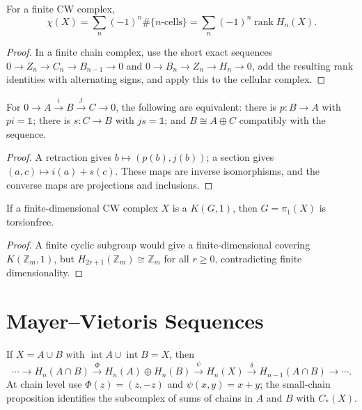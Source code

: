 \begin{theorem}
\label{thm:euler-characteristic-homology}

For a finite CW complex,
\[
\chi(X)=\sum_n(-1)^n\#\{n\text{-cells}\}=\sum_n(-1)^n\operatorname{rank}H_n(X).
\]
\end{theorem}
\begin{proof}
\sketch In a finite chain complex, use the short exact sequences $0\to Z_n\to C_n\to B_{n-1}\to0$ and $0\to B_n\to Z_n\to H_n\to0$, add the resulting rank identities with alternating signs, and apply this to the cellular complex.
\end{proof}

\begin{lemma}
\label{lem:splitting-lemma}

For $0\to A\xrightarrow{i}B\xrightarrow{j}C\to0$, the following are equivalent: there is $p:B\to A$ with $pi=\mathbb{1}$; there is $s:C\to B$ with $js=\mathbb{1}$; and $B\cong A\oplus C$ compatibly with the sequence.
\end{lemma}
\begin{proof}
\sketch A retraction gives $b\mapsto(p(b),j(b))$; a section gives $(a,c)\mapsto i(a)+s(c)$.  These maps are inverse isomorphisms, and the converse maps are projections and inclusions.
\end{proof}

\begin{proposition}
\label{prop:fundamental-group-kg1-torsionfree}

If a finite-dimensional CW complex $X$ is a $K(G,1)$, then $G=\pi_1(X)$ is torsionfree.
\end{proposition}
\begin{proof}
\sketch A finite cyclic subgroup would give a finite-dimensional covering $K(\mathbb{Z}_m,1)$, but $H_{2r+1}(\mathbb{Z}_m)\cong\mathbb{Z}_m$ for all $r\geq0$, contradicting finite dimensionality.
\end{proof}

\section*{Mayer--Vietoris Sequences}

If $X=A\cup B$ with $\operatorname{int}A\cup\operatorname{int}B=X$, then
\[
\cdots\to H_n(A\cap B)\xrightarrow{\Phi}H_n(A)\oplus H_n(B)\xrightarrow{\psi}H_n(X)\xrightarrow{\delta}H_{n-1}(A\cap B)\to\cdots.
\]
At chain level use $\Phi(z)=(z,-z)$ and $\psi(x,y)=x+y$; the small-chain proposition identifies the subcomplex of sums of chains in $A$ and $B$ with $C_*(X)$.

